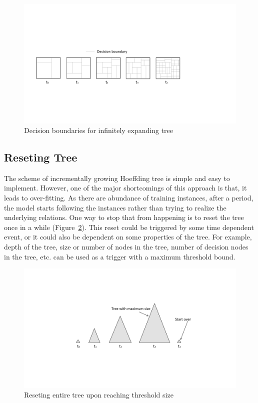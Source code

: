 \begin{figure}[htbp]
    \begin{center}
        \includegraphics[width=14.0cm]{figs/infgrowdb.pdf}
        \caption{Decision boundaries for infinitely expanding tree}
        \label{fig:algo:infgrowdb}
    \end{center}
\end{figure}


\subsection{Reseting Tree}
The scheme of incrementally growing Hoeffding tree is simple and easy to implement. However, one of the major shortcomings of this approach is that, it leads to over-fitting. As there are abundance of training instances, after a period, the model starts following the instances rather than trying to realize the underlying relations. One way to stop that from happening is to reset the tree once in a while (Figure~\ref{fig:algo:reset}). This reset could be triggered by some time dependent event, or it could also be dependent on some properties of the tree. For example, depth of the tree, size or number of nodes in the tree, number of decision nodes in the tree, etc. can be used as a trigger with a maximum threshold bound.

\begin{figure}[htbp]
    \begin{center}
        \includegraphics[width=12.0cm]{figs/reset.pdf}
        \caption{Reseting entire tree upon reaching threshold size}
        \label{fig:algo:reset}
    \end{center}
\end{figure}


